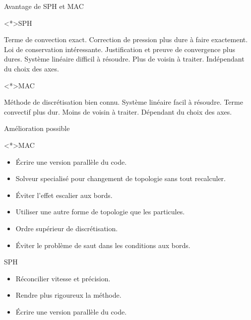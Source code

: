 \begin{frame}[<+->]{Avantage de SPH et MAC}
 
 \begin{block}<*>{SPH}
  \begin{itemize}
   \plusitem Terme de convection exact.
   \moinsitem Correction de pression plus dure à faire exactement.
   \plusitem Loi de conservation intéressante.
   \moinsitem Justification et preuve de convergence plus dures.
   \moinsitem Système linéaire difficil à résoudre.
   \moinsitem Plus de voisin à traiter.
   \plusitem Indépendant du choix des axes.
  \end{itemize}

 \end{block}

 \begin{block}<*>{MAC}
  \begin{itemize}
   \plusitem Méthode de discrétisation bien connu.
   \plusitem Système linéaire facil à résoudre.
   \moinsitem Terme convectif plus dur.
   \plusitem Moins de voisin à traiter.
   \moinsitem Dépendant du choix des axes.
  \end{itemize}

 \end{block}

 
\end{frame}

\begin{frame}[<+->]{Amélioration possible}
 
 \begin{block}<*>{MAC}
  \begin{itemize}
   \item Écrire une version parallèle du code.
   \item Solveur specialisé pour changement de topologie sans tout recalculer.
   \item Éviter l'effet escalier aux bords.
   \item Utiliser une autre forme de topologie que les particules.
   \item Ordre supérieur de discrétisation.
   \item Éviter le problème de saut dans les conditions aux bords.
  \end{itemize}
  \end{block}

\begin{block}{SPH}
\begin{itemize}
 \item Réconcilier vitesse et précision.
 \item Rendre plus rigoureux la méthode.
 \item Écrire une version parallèle du code.
 \end{itemize}
\end{block}

 
\end{frame}

